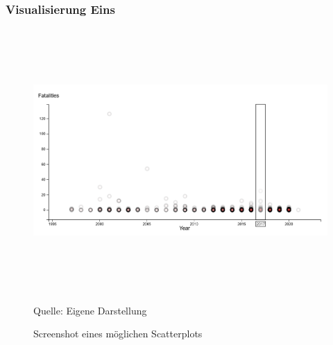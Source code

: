 \documentclass[usegeometry=true]{scrartcl}
\begin{document}
\subsubsection{Visualisierung Eins}

\begin{figure}[]
\begin{center}
\includegraphics[width=12cm,height=10cm,keepaspectratio]{Scatterplot.PNG}%
\caption{Screenshot eines möglichen Scatterplots}
Quelle: Eigene Darstellung
\label{scatterplot}
\end{center}
\end{figure}
\end{document}
